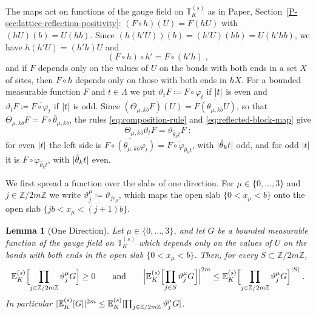 \documentclass[11pt]{preprint}
\DeclarePairedDelimiter{\abs}{\lvert}{\rvert}
\numberwithin{equation}{section}
\newtheorem{lemma}[theorem]{Lemma}
\theoremstyle{definition}
\theoremstyle{remark}
\theoremstyle{plain}
\begin{document}
The maps act on functions of the gauge field on $\mathbb T^{(s)}_K$ as in Paper, Section~\ref{P-sec:lattice-reflection-positivity}: $(F \circ h)(U) = F(hU)$ with $(hU)(b) = U(hb)$. Since $(h(h'U))(b) = (h'U)(hb) = U(h'hb)$, we have $h(h'U) = (h'h)U$ and
\begin{equation}\label{eq:composition-rule}
    (F \circ h) \circ h' = F \circ (h'h)\;,
\end{equation}
and if $F$ depends only on the values of $U$ on the bonds with both ends in a set $X$ of sites, then $F \circ h$ depends only on those with both ends in $hX$. For a bounded measurable function $F$ and $t \in \Lambda$ we put $\vartheta_tF \coloneqq F \circ \varphi_t$ if $\abs{t}$ is even and $\vartheta_tF \coloneqq \overline{F \circ \varphi_t}$ if $\abs{t}$ is odd. Since $(\Theta_{\mu,kb}F)(U) = \overline{F(\theta_{\mu,kb}U)}$, so that $\Theta_{\mu,kb}F = \overline{F \circ \theta_{\mu,kb}}$, the rules \eqref{eq:composition-rule} and \eqref{eq:reflected-block-map} give
\begin{equation}\label{eq:reflected-block}
    \Theta_{\mu,kb}\vartheta_tF = \vartheta_{\hat\theta_kt}F\;:
\end{equation}
for even $\abs{t}$ the left side is $\overline{F \circ (\theta_{\mu,kb}\varphi_t)} = \overline{F \circ \varphi_{\hat\theta_kt}}$, with $\abs{\hat\theta_kt}$ odd, and for odd $\abs{t}$ it is $F \circ \varphi_{\hat\theta_kt}$, with $\abs{\hat\theta_kt}$ even.

We first spread a function over the slabs of one direction. For $\mu \in \{ 0, \dots, 3 \}$ and $j \in \mathbb Z/2m\mathbb Z$ we write $\vartheta^\mu_j \coloneqq \vartheta_{je_\mu}$, which maps the open slab $\{ 0 < x_\mu < b \}$ onto the open slab $\{ jb < x_\mu < (j + 1)b \}$.

\begin{lemma}[One Direction]\label{lem:one-direction}
Let $\mu \in \{ 0, \dots, 3 \}$, and let $G$ be a bounded measurable function of the gauge field on $\mathbb T^{(s)}_K$ which depends only on the values of $U$ on the bonds with both ends in the open slab $\{ 0 < x_\mu < b \}$. Then, for every $S \subset \mathbb Z/2m\mathbb Z$,
\begin{equation}\label{eq:one-direction}
    \mathbb E^{(s)}_K\Bigl[\prod_{j \in \mathbb Z/2m\mathbb Z}\vartheta^\mu_jG\Bigr] \geq 0
    \qquad\text{and}\qquad
    \Bigl\lvert\mathbb E^{(s)}_K\Bigl[\prod_{j \in S}\vartheta^\mu_jG\Bigr]\Bigr\rvert^{2m} \leq \mathbb E^{(s)}_K\Bigl[\prod_{j \in \mathbb Z/2m\mathbb Z}\vartheta^\mu_jG\Bigr]^{\abs{S}}\;.
\end{equation}
In particular $\abs{\mathbb E^{(s)}_K[G]}^{2m} \leq \mathbb E^{(s)}_K[\prod_{j \in \mathbb Z/2m\mathbb Z}\vartheta^\mu_jG]$.
\end{lemma}
\end{document}
